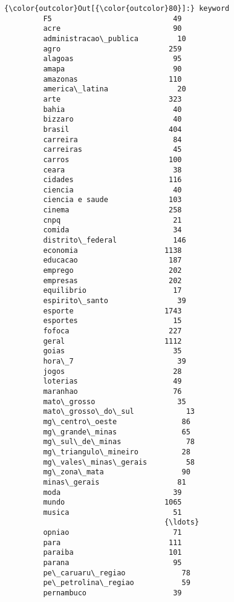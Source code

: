 \documentclass[11pt]{article}
\begin{document}
\begin{Verbatim}[commandchars=\\\{\}]
{\color{outcolor}Out[{\color{outcolor}80}]:} keyword
         F5                            49
         acre                          90
         administracao\_publica         10
         agro                         259
         alagoas                       95
         amapa                         90
         amazonas                     110
         america\_latina                20
         arte                         323
         bahia                         40
         bizzaro                       40
         brasil                       404
         carreira                      84
         carreiras                     45
         carros                       100
         ceara                         38
         cidades                      116
         ciencia                       40
         ciencia e saude              103
         cinema                       258
         cnpq                          21
         comida                        34
         distrito\_federal             146
         economia                    1138
         educacao                     187
         emprego                      202
         empresas                     202
         equilibrio                    17
         espirito\_santo                39
         esporte                     1743
         esportes                      15
         fofoca                       227
         geral                       1112
         goias                         35
         hora\_7                        39
         jogos                         28
         loterias                      49
         maranhao                      76
         mato\_grosso                   35
         mato\_grosso\_do\_sul            13
         mg\_centro\_oeste               86
         mg\_grande\_minas               65
         mg\_sul\_de\_minas               78
         mg\_triangulo\_mineiro          28
         mg\_vales\_minas\_gerais         58
         mg\_zona\_mata                  90
         minas\_gerais                  81
         moda                          39
         mundo                       1065
         musica                        51
                                     {\ldots} 
         opniao                        71
         para                         111
         paraiba                      101
         parana                        95
         pe\_caruaru\_regiao             78
         pe\_petrolina\_regiao           59
         pernambuco                    39

\end{Verbatim}
\end{document}
